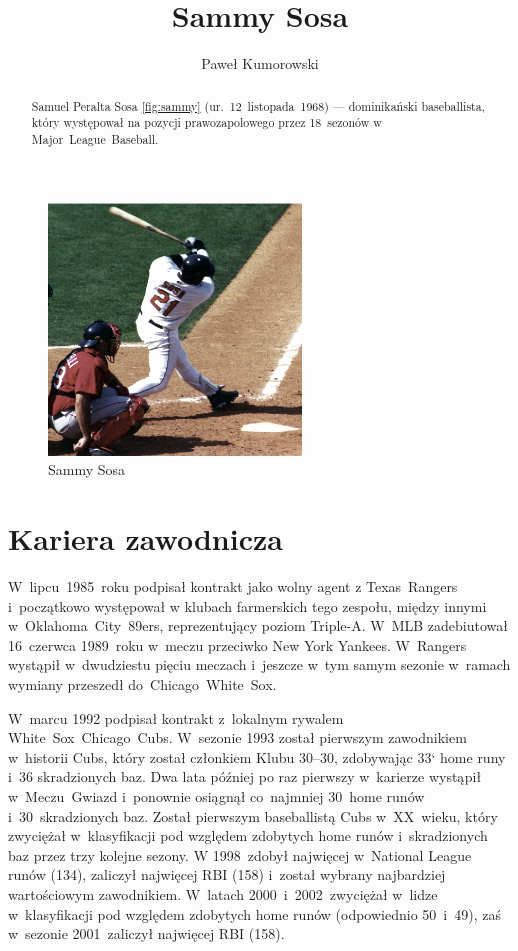 \documentclass[a4paper,12pt]{article}
\title{Sammy Sosa}
\author{Paweł Kumorowski}
\begin{document}
\maketitle

\begin{figure}[h]
	\centering
		\includegraphics[width=0.6\textwidth]{sosa.eps}
		\caption{Sammy Sosa} \label{fig:sammy}

\end{figure}

\begin{abstract}
Samuel Peralta Sosa \ref{fig:sammy} (ur.~12~listopada~1968) --- dominikański baseballista, który występował na pozycji prawozapolowego przez 18~sezonów w Major~League~Baseball.
\end{abstract}

\tableofcontents

\section{Kariera zawodnicza}
W~lipcu~1985~roku podpisał kontrakt jako wolny agent z Texas~Rangers i~początkowo występował w klubach farmerskich tego zespołu, między innymi w~Oklahoma~City~89ers, reprezentujący poziom Triple-A\cite{label1}\cite{label2}. W~MLB zadebiutował 16~czerwca 1989~roku w~meczu przeciwko New York Yankees. W~Rangers wystąpił w~dwudziestu pięciu meczach i~jeszcze w~tym samym sezonie w~ramach wymiany przeszedł do~Chicago~White~Sox.

W~marcu 1992 podpisał kontrakt z~lokalnym rywalem White~Sox~Chicago~Cubs. W~sezonie 1993 został pierwszym zawodnikiem w~historii Cubs, który został członkiem Klubu 30–30, zdobywając 33` home runy i~36 skradzionych baz. Dwa lata później po raz pierwszy w~karierze wystąpił w~Meczu~Gwiazd i~ponownie osiągnął co~najmniej 30~home runów i~30~skradzionych baz. Został pierwszym baseballistą Cubs w~XX~wieku, który zwyciężał w~klasyfikacji pod względem zdobytych home runów i~skradzionych baz przez trzy kolejne sezony. W 1998~zdobył najwięcej w~National League runów (134), zaliczył najwięcej RBI (158) i~został wybrany najbardziej wartościowym zawodnikiem. W~latach 2000~i~2002~zwyciężał w~lidze w~klasyfikacji pod względem zdobytych home runów (odpowiednio 50~i~49), zaś w~sezonie 2001~zaliczył najwięcej RBI (158).
\end{document}
